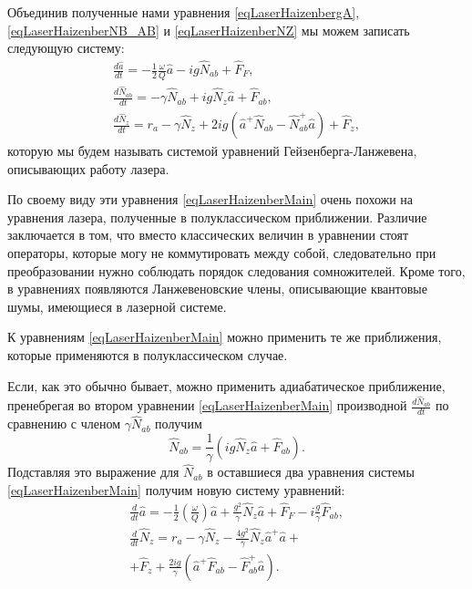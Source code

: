 Объединив полученные нами уравнения \eqref{eqLaserHaizenbergA}, 
\eqref{eqLaserHaizenberNB_AB} и
\eqref{eqLaserHaizenberNZ} мы можем записать следующую 
систему:
\begin{eqnarray}
\frac{d \hat{a}}{d t} = 
- \frac{1}{2}\frac{\omega}{Q}\hat{a}
-i g \hat{N}_{ab} + 
\hat{F}_F,
\nonumber \\
\frac{d \hat{N}_{ab}}{d t} = 
- \gamma \hat{N}_{ab} 
+ i g \hat{N}_{z} \hat{a} 
 + \hat{F}_{ab},
\nonumber \\
\frac{d \hat{N}_z}{d t} = r_a
- \gamma \hat{N}_{z} +
2 i g 
 \left(
\hat{a}^{+}\hat{N}_{ab} -
\hat{N}_{ab}^{+}\hat{a}
\right) + \hat{F}_{z},
\label{eqLaserHaizenberMain}
\end{eqnarray}
которую мы будем называть системой уравнений Гейзенберга-Ланжевена,
описывающих работу лазера.

По своему виду эти уравнения \eqref{eqLaserHaizenberMain} очень похожи
на уравнения лазера, полученные в полуклассическом
приближении. Различие заключается в том, 
что вместо классических величин в уравнении стоят операторы, которые
могу не коммутировать между собой, следовательно при преобразовании
нужно соблюдать порядок следования сомножителей. Кроме того, в
уравнениях появляются Ланжевеновские члены, описывающие квантовые
шумы, имеющиеся в лазерной системе.

К уравнениям \eqref{eqLaserHaizenberMain}
можно применить те же приближения, которые применяются в
полуклассическом случае.

Если, как это обычно бывает, 
можно применить адиабатическое приближение,
пренебрегая во втором уравнении \eqref{eqLaserHaizenberMain} производной
$\frac{d\hat{N}_{ab}}{d t}$ по сравнению с членом $\gamma
\hat{N}_{ab}$ получим
\begin{equation}
\hat{N}_{ab} = \frac{1}{\gamma} \left(i g \hat{N}_z\hat{a} +
\hat{F}_{ab}\right).
\nonumber
\end{equation}
Подставляя это выражение для $\hat{N}_{ab}$ в оставшиеся два уравнения
системы \eqref{eqLaserHaizenberMain} получим новую
систему уравнений:
\begin{eqnarray}
\frac{d}{dt} \hat{a} = -
\frac{1}{2}\left(\frac{\omega}{Q}\right)\hat{a} + \frac{g^2}{\gamma}
\hat{N}_z\hat{a} + \hat{F}_F - i\frac{g}{\gamma}\hat{F}_{ab},
\nonumber \\
\frac{d}{dt}\hat{N}_z = r_a -
\gamma\hat{N}_z - \frac{4g^2}{\gamma}
\hat{N}_z\hat{a}^{+}\hat{a} +
\nonumber \\
+ \hat{F}_z + \frac{2ig}{\gamma} \left(\hat{a}^{+}\hat{F}_{ab} -
\hat{F}_{ab}^{+}\hat{a}\right).
\label{eqLaserHaizenberg16add}
\end{eqnarray}

